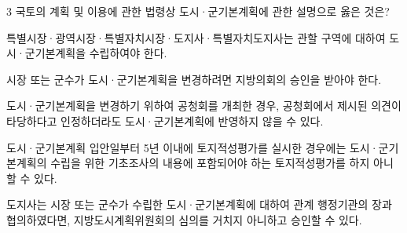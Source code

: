 \begin{question}{3}
국토의 계획 및 이용에 관한 법령상 도시·군기본계획에 관한 설명으로 옳은 것은?
\begin{choices}
  \item 특별시장·광역시장·특별자치시장·도지사·특별자치도지사는 관할 구역에 대하여 도시·군기본계획을 수립하여야 한다.
  \item 시장 또는 군수가 도시·군기본계획을 변경하려면 지방의회의 승인을 받아야 한다.
  \item 도시·군기본계획을 변경하기 위하여 공청회를 개최한 경우, 공청회에서 제시된 의견이 타당하다고 인정하더라도 도시·군기본계획에 반영하지 않을 수 있다.
  \item 도시·군기본계획 입안일부터 5년 이내에 토지적성평가를 실시한 경우에는 도시·군기본계획의 수립을 위한 기초조사의 내용에 포함되어야 하는 토지적성평가를 하지 아니할 수 있다.
  \item 도지사는 시장 또는 군수가 수립한 도시·군기본계획에 대하여 관계 행정기관의 장과 협의하였다면, 지방도시계획위원회의 심의를 거치지 아니하고 승인할 수 있다.
\end{choices}
\end{question}
